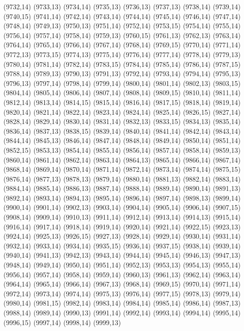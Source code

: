 (9732,14)
(9733,13)
(9734,14)
(9735,13)
(9736,13)
(9737,13)
(9738,14)
(9739,14)
(9740,15)
(9741,14)
(9742,14)
(9743,14)
(9744,14)
(9745,14)
(9746,14)
(9747,14)
(9748,14)
(9749,13)
(9750,13)
(9751,14)
(9752,14)
(9753,15)
(9754,14)
(9755,14)
(9756,14)
(9757,14)
(9758,14)
(9759,13)
(9760,15)
(9761,13)
(9762,13)
(9763,14)
(9764,14)
(9765,14)
(9766,14)
(9767,14)
(9768,14)
(9769,15)
(9770,14)
(9771,14)
(9772,13)
(9773,15)
(9774,13)
(9775,14)
(9776,14)
(9777,14)
(9778,14)
(9779,13)
(9780,14)
(9781,14)
(9782,14)
(9783,15)
(9784,14)
(9785,14)
(9786,14)
(9787,15)
(9788,14)
(9789,13)
(9790,13)
(9791,13)
(9792,14)
(9793,14)
(9794,14)
(9795,13)
(9796,13)
(9797,14)
(9798,14)
(9799,14)
(9800,14)
(9801,14)
(9802,13)
(9803,15)
(9804,14)
(9805,14)
(9806,14)
(9807,14)
(9808,14)
(9809,15)
(9810,14)
(9811,14)
(9812,14)
(9813,14)
(9814,15)
(9815,14)
(9816,14)
(9817,15)
(9818,14)
(9819,14)
(9820,14)
(9821,14)
(9822,14)
(9823,14)
(9824,14)
(9825,14)
(9826,15)
(9827,14)
(9828,14)
(9829,14)
(9830,14)
(9831,14)
(9832,13)
(9833,15)
(9834,13)
(9835,14)
(9836,14)
(9837,13)
(9838,15)
(9839,14)
(9840,14)
(9841,14)
(9842,14)
(9843,14)
(9844,14)
(9845,13)
(9846,14)
(9847,14)
(9848,14)
(9849,14)
(9850,14)
(9851,14)
(9852,15)
(9853,13)
(9854,14)
(9855,14)
(9856,14)
(9857,14)
(9858,14)
(9859,13)
(9860,14)
(9861,14)
(9862,14)
(9863,14)
(9864,13)
(9865,14)
(9866,14)
(9867,14)
(9868,14)
(9869,14)
(9870,14)
(9871,14)
(9872,14)
(9873,14)
(9874,14)
(9875,15)
(9876,14)
(9877,13)
(9878,13)
(9879,14)
(9880,14)
(9881,13)
(9882,14)
(9883,14)
(9884,14)
(9885,14)
(9886,13)
(9887,14)
(9888,14)
(9889,14)
(9890,14)
(9891,13)
(9892,14)
(9893,14)
(9894,13)
(9895,14)
(9896,14)
(9897,14)
(9898,13)
(9899,14)
(9900,14)
(9901,14)
(9902,13)
(9903,14)
(9904,14)
(9905,14)
(9906,14)
(9907,15)
(9908,14)
(9909,14)
(9910,13)
(9911,14)
(9912,14)
(9913,14)
(9914,13)
(9915,14)
(9916,14)
(9917,14)
(9918,14)
(9919,14)
(9920,14)
(9921,14)
(9922,15)
(9923,13)
(9924,14)
(9925,13)
(9926,15)
(9927,13)
(9928,14)
(9929,14)
(9930,14)
(9931,14)
(9932,14)
(9933,14)
(9934,14)
(9935,15)
(9936,14)
(9937,15)
(9938,14)
(9939,14)
(9940,14)
(9941,13)
(9942,13)
(9943,14)
(9944,14)
(9945,14)
(9946,13)
(9947,13)
(9948,14)
(9949,14)
(9950,14)
(9951,14)
(9952,13)
(9953,13)
(9954,13)
(9955,14)
(9956,14)
(9957,14)
(9958,14)
(9959,14)
(9960,13)
(9961,13)
(9962,14)
(9963,14)
(9964,14)
(9965,14)
(9966,14)
(9967,13)
(9968,14)
(9969,15)
(9970,14)
(9971,14)
(9972,14)
(9973,14)
(9974,14)
(9975,13)
(9976,14)
(9977,15)
(9978,13)
(9979,14)
(9980,14)
(9981,15)
(9982,14)
(9983,14)
(9984,14)
(9985,14)
(9986,14)
(9987,13)
(9988,14)
(9989,14)
(9990,13)
(9991,14)
(9992,14)
(9993,14)
(9994,14)
(9995,14)
(9996,15)
(9997,14)
(9998,14)
(9999,13)

